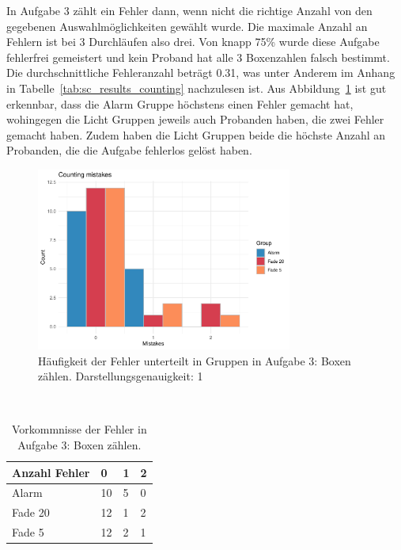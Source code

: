 In Aufgabe 3 zählt ein Fehler dann, wenn nicht die richtige Anzahl von den gegebenen Auswahlmöglichkeiten gewählt wurde. Die maximale Anzahl an Fehlern ist bei 3 Durchläufen also drei.
Von knapp 75\% wurde diese Aufgabe fehlerfrei gemeistert und kein Proband hat alle 3 Boxenzahlen falsch bestimmt. Die durchschnittliche Fehleranzahl beträgt 0.31, was unter Anderem im Anhang in Tabelle~\ref{tab:sc_results_counting} nachzulesen ist.
Aus Abbildung~\ref{fig:countingMistakeHistogram} ist gut erkennbar, dass die Alarm Gruppe höchstens einen Fehler gemacht hat, wohingegen die Licht Gruppen jeweils auch Probanden haben, die zwei Fehler gemacht haben. Zudem haben die Licht Gruppen beide die höchste Anzahl an Probanden, die die Aufgabe fehlerlos gelöst haben.

\begin{figure}[H]
	\centering
	\includegraphics[width=0.75\textwidth]{./_StudyResults/countingMisHist}
	\caption{Häufigkeit der Fehler unterteilt in Gruppen in Aufgabe 3: Boxen zählen. Darstellungsgenauigkeit: 1}
	\label{fig:countingMistakeHistogram}
\end{figure}

\begin{table}
	\caption{Vorkommnisse der Fehler in Aufgabe 3: Boxen zählen.}~\label{tab:countingMistakeNumbers}
	
	\setlength\tabcolsep{3pt}
	\renewcommand{\arraystretch}{1.4}%
	\begin{tabularx}{\textwidth}{ | l | x | x | x | }
		\hline
		Anzahl Fehler & 0   & 1  & 2 \\ \hline\hline
		Alarm 	  & 10  & 5  & 0 \\ \hline
		Fade 20   & 12  & 1  & 2 \\ \hline
		Fade 5 	  & 12  & 2  & 1 \\ \hline
	\end{tabularx}
\end{table}

